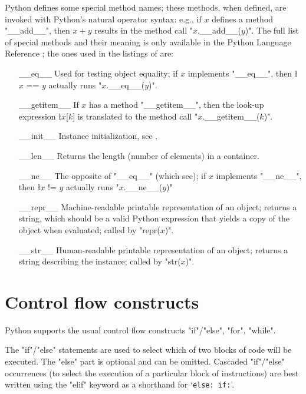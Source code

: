{Python defines some special method names; these methods, when defined,
are invoked with Python's natural operator syntax: e.g., if $x$
defines a method "__add__", then $x + y$ results in the method call
"$x$.__add__($y$)".  The full list of special methods and their
meaning is only available in the Python Language Reference
\cite{python:reference}; the ones used in the listings of
 are:
\begin{itemize}
\item[{\ttfamily \_\_eq\_\_}] Used for testing object equality; if $x$ implements
  "__eq__", then \l{$x$ == $y$} actually runs "$x$.__eq__($y$)".
\item[{\ttfamily \_\_getitem\_\_}] If $x$ has a method "__getitem__", then the
  look-up expression \l{$x$[$k$]} is translated to the method call
  "$x$.__getitem__($k$)".
\item[{\ttfamily \_\_init\_\_}] Instance initialization, see .
\item[{\ttfamily \_\_len\_\_}] Returns the length (number of elements) in a
  container.
\item[{\ttfamily \_\_ne\_\_}] The opposite of "__eq__" (which see); if $x$
  implements "__ne__", then \l{$x$ != $y$} actually runs
  "$x$.__ne__($y$)"
\item[{\ttfamily \_\_repr\_\_}] Machine-readable printable representation of an
  object; returns a string, which should be a valid Python expression
  that yields a copy of the object when evaluated; called by
  "repr($x$)".
\item[{\ttfamily \_\_str\_\_}] Human-readable printable representation of an
  object; returns a string describing the instance; called by
  "str($x$)".
\end{itemize}


\section{Control flow constructs}
\label{sec:control-flow}

Python supports the usual control flow constructs
"if"/"else", "for", "while".

The "if"/"else" statements are used to select which of two
blocks of code will be executed.  The "else" part is optional and
can be omitted.  Cascaded "if"/"else" occurrences (to
select the execution of a particular block of instructions) are best
written using the "elif" keyword as a shorthand for 
`\verb"else: if:"'. 

}
